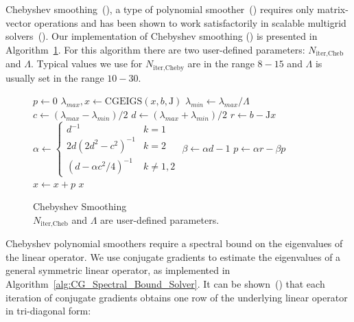 Chebyshev smoothing~(\citet*{li2011chebyshev}), a type of polynomial
smoother~(\citet*{saad2003iterative})
requires only matrix-vector operations and has been shown to work
satisfactorily in scalable multigrid
solvers~(\citet*{ghysels2012improving}).  Our implementation of
Chebyshev smoothing (\citet*{li2011chebyshev}) is presented in
Algorithm~\ref{alg:Chebyshev_Smoother}. For this algorithm there are two user-defined parameters: $N_\text{iter,Cheb}$ and $\Lambda$. Typical values we use for $N_\text{iter,Cheby}$ are in the range $8-15$ and $\Lambda$ is usually set in the range $10-30$.
%
%
\begin{figure}
  \begin{algorithm}[H]
    \caption{Chebyshev Smoothing\\ $N_\text{iter,Cheb}$ and $\Lambda$ are user-defined parameters.
}\label{alg:Chebyshev_Smoother}
    \begin{algorithmic}[1]
      \State $p \leftarrow 0$
      \State  $\lambda_{max}, x \leftarrow \text{CGEIGS}(x,b,\mathrm{J})$
      \State $\lambda_{min} \leftarrow \lambda_{max}/\Lambda$
      \State $c \leftarrow (\lambda_{max} - \lambda_{min})/2$
      \State $d \leftarrow (\lambda_{max} + \lambda_{min})/2$
      \State $r \leftarrow b - \mathrm{J}x$
\State  $\alpha \leftarrow 
  \begin{cases}
  d^{-1} & k = 1\\
  2d(2d^2-c^2)^{-1} & k = 2\\
  (d - \alpha c^2/4)^{-1} & k \neq 1,2
  \end{cases}
  $\;
  \State $\beta \leftarrow \alpha d - 1$
  \State $p \leftarrow \alpha r - \beta p$
  \State $x \leftarrow x + p$
  \EndFor
  \State \Return $x$
      \EndFunction
    \end{algorithmic}
  \end{algorithm}
\end{figure}
%
Chebyshev polynomial smoothers require a spectral bound on the
eigenvalues of the linear operator. We use conjugate gradients to estimate the eigenvalues of a general symmetric linear operator, as implemented in Algorithm~\ref{alg:CG_Spectral_Bound_Solver}.  It can be shown~(\citet*{scales1989use}) that each iteration of conjugate gradients obtains one row of the underlying linear operator in tri-diagonal form:

